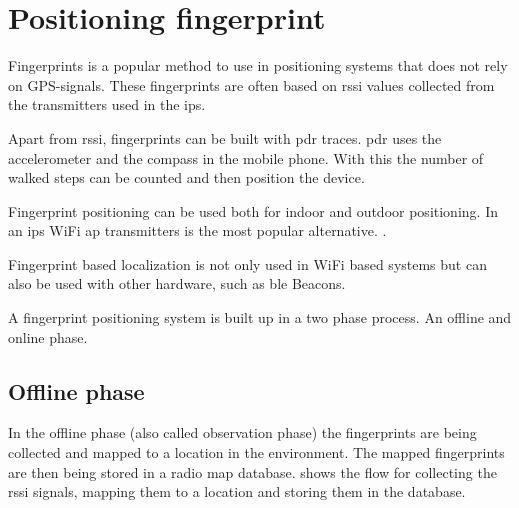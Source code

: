 \section{Positioning fingerprint}\label{sec:theoryFingerprint}
Fingerprints is a popular method to use in positioning systems that does not rely on GPS-signals.
These fingerprints are often based on \acrshort{rssi} values collected from the transmitters used in the \acrfull{ips}.
\cite{LocationFingerprintingInfrastructure2004, AutomaticConstructionRadio2018}

\bigskip

Apart from \acrshort{rssi}, fingerprints can be built with \acrfull{pdr} traces.
\acrshort{pdr} uses the accelerometer and the compass in the mobile phone.
With this the number of walked steps can be counted and then position the device.
\cite{AutomaticConstructionRadio2018, NoNeedWardrive2012}

\bigskip

Fingerprint positioning can be used both for indoor and outdoor positioning.
In an \acrshort{ips} WiFi \acrshort{ap} transmitters is the most popular alternative.
\cite{LocationFingerprintingInfrastructure2004,
IndoorFingerprintPositioning2017}.

\bigskip

Fingerprint based localization is not only used in WiFi based systems but can
also be used with other hardware, such as \acrlong{ble} Beacons.
\cite{PracticalFingerprintingLocalization2017} 

\bigskip

A fingerprint positioning system is built up in a two phase process.  An offline
and online phase.\cite{IndoorFingerprintPositioning2017} 


\subsection{Offline phase}\label{sec:theoryFingerprintOffline}
In the offline phase (also called observation phase) the fingerprints are being collected and
mapped to a location in the environment.
The mapped fingerprints are then being stored in a radio map database.
 shows the flow for collecting the \acrshort{rssi} signals, mapping them to a location and storing them in the database.
\cite{IndoorFingerprintPositioning2017} 



